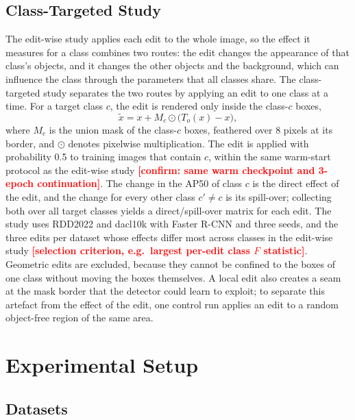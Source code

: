 \documentclass[conference]{IEEEtran}
\newcommand{\todo}[1]{\textcolor{red}{\textbf{[#1]}}}
\begin{document}
\subsection{Class-Targeted Study}
\label{sec:measure_targeted}

The edit-wise study applies each edit to the whole image, so the effect it measures for a class combines two routes: the edit changes the appearance of that class's objects, and it changes the other objects and the background, which can influence the class through the parameters that all classes share. The class-targeted study separates the two routes by applying an edit to one class at a time. For a target class $c$, the edit is rendered only inside the class-$c$ boxes,
\begin{equation}
\tilde x=x+M_c\odot\bigl(T_o(x)-x\bigr),
\label{eq:targeted}
\end{equation}
where $M_c$ is the union mask of the class-$c$ boxes, feathered over 8 pixels at its border, and $\odot$ denotes pixelwise multiplication. The edit is applied with probability 0.5 to training images that contain $c$, within the same warm-start protocol as the edit-wise study \todo{confirm: same warm checkpoint and 3-epoch continuation}. The change in the AP50 of class $c$ is the direct effect of the edit, and the change for every other class $c'\neq c$ is its spill-over; collecting both over all target classes yields a direct/spill-over matrix for each edit. The study uses RDD2022 and dacl10k with Faster R-CNN and three seeds, and the three edits per dataset whose effects differ most across classes in the edit-wise study \todo{selection criterion, e.g.\ largest per-edit class $F$ statistic}. Geometric edits are excluded, because they cannot be confined to the boxes of one class without moving the boxes themselves. A local edit also creates a seam at the mask border that the detector could learn to exploit; to separate this artefact from the effect of the edit, one control run applies an edit to a random object-free region of the same area.

\section{Experimental Setup}
\label{sec:setup}

\subsection{Datasets}
\label{sec:setup_data}
\end{document}

